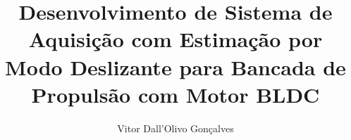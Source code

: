 \documentclass[aspectratio=169,11pt]{beamer}
\title{Desenvolvimento de Sistema de Aquisição com Estimação por Modo
       Deslizante para Bancada de Propulsão com Motor BLDC}
\author{Vitor Dall'Olivo Gonçalves}
\begin{document}
\capaudesc








\fechamentoudesc
\end{document}
